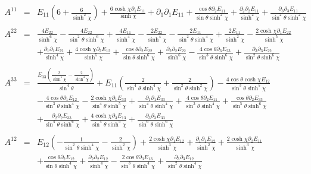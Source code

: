 \documentclass[10pt,letterpaper]{article}
\numberwithin{equation}{section}
\begin{document}
\begin{eqnarray}
A^{11}&=& E_{11} \left(6 + \frac{6}{\sinh^2\chi}\right) + \frac{6 \cosh\chi \partial_{1}E_{11}}{\sinh\chi} + \partial_{1}\partial_{1}E_{11} + \frac{\cos\theta \partial_{2}E_{11}}{\sin\theta \sinh^2\chi} + \frac{\partial_{2}\partial_{2}E_{11}}{\sinh^2\chi} + \frac{\partial_{3}\partial_{3}E_{11}}{\sin^2\theta \sinh^2\chi}
\\  \nonumber\\ 
A^{22}&=& \frac{4 E_{22}}{\sinh^6\chi} -  \frac{4 E_{22}}{\sin^2\theta \sinh^6\chi} + \frac{4 E_{11}}{\sinh^4\chi} -  \frac{2 E_{22}}{\sinh^4\chi} -  \frac{2 E_{11}}{\sin^2\theta \sinh^4\chi} + \frac{2 E_{11}}{\sinh^2\chi} -  \frac{2 \cosh\chi \partial_{1}E_{22}}{\sinh^5\chi} \nonumber \\ 
&& + \frac{\partial_{1}\partial_{1}E_{22}}{\sinh^4\chi} + \frac{4 \cosh\chi \partial_{2}E_{12}}{\sinh^5\chi} + \frac{\cos\theta \partial_{2}E_{22}}{\sin\theta \sinh^6\chi} + \frac{\partial_{2}\partial_{2}E_{22}}{\sinh^6\chi} -  \frac{4 \cos\theta \partial_{3}E_{23}}{\sin^3\theta \sinh^6\chi} + \frac{\partial_{3}\partial_{3}E_{22}}{\sin^2\theta \sinh^6\chi}
\\  \nonumber\\ 
A^{33}&=& \frac{E_{33} \left(\frac{2}{\sinh^6\chi} -  \frac{2}{\sinh^4\chi}\right)}{\sin^4\theta} + E_{11} \left(\frac{2}{\sin^4\theta \sinh^4\chi} + \frac{2}{\sin^2\theta \sinh^2\chi}\right) -  \frac{4 \cos\theta \cosh\chi E_{12}}{\sin^3\theta \sinh^5\chi} \nonumber \\ 
&& -  \frac{4 \cos\theta \partial_{1}E_{12}}{\sin^3\theta \sinh^4\chi} -  \frac{2 \cosh\chi \partial_{1}E_{33}}{\sin^4\theta \sinh^5\chi} + \frac{\partial_{1}\partial_{1}E_{33}}{\sin^4\theta \sinh^4\chi} + \frac{4 \cos\theta \partial_{2}E_{11}}{\sin^3\theta \sinh^4\chi} + \frac{\cos\theta \partial_{2}E_{33}}{\sin^5\theta \sinh^6\chi} \nonumber \\ 
&& + \frac{\partial_{2}\partial_{2}E_{33}}{\sin^4\theta \sinh^6\chi} + \frac{4 \cosh\chi \partial_{3}E_{13}}{\sin^4\theta \sinh^5\chi} + \frac{\partial_{3}\partial_{3}E_{33}}{\sin^6\theta \sinh^6\chi}
\\  \nonumber\\ 
A^{12}&=& E_{12} \left(- \frac{1}{\sin^2\theta \sinh^4\chi} -  \frac{2}{\sinh^2\chi}\right) + \frac{2 \cosh\chi \partial_{1}E_{12}}{\sinh^3\chi} + \frac{\partial_{1}\partial_{1}E_{12}}{\sinh^2\chi} + \frac{2 \cosh\chi \partial_{2}E_{11}}{\sinh^3\chi} \nonumber \\ 
&& + \frac{\cos\theta \partial_{2}E_{12}}{\sin\theta \sinh^4\chi} + \frac{\partial_{2}\partial_{2}E_{12}}{\sinh^4\chi} -  \frac{2 \cos\theta \partial_{3}E_{13}}{\sin^3\theta \sinh^4\chi} + \frac{\partial_{3}\partial_{3}E_{12}}{\sin^2\theta \sinh^4\chi}

\end{eqnarray}
\end{document}
